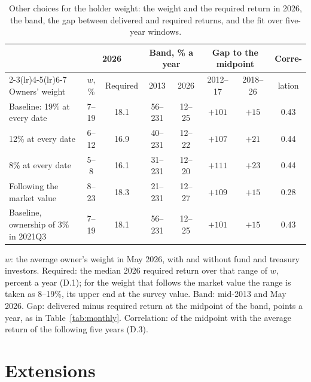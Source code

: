 \documentclass[11pt]{article}
\begin{document}
\begin{table}[ht]\centering\small
\caption{Other choices for the holder weight: the weight and the required return in 2026, the band, the gap between delivered and required returns, and the fit over five-year windows.}
\label{tab:paths}
\setlength{\tabcolsep}{4.5pt}
\begin{tabular}{lccccccc}
\toprule
 & \multicolumn{2}{c}{2026} & \multicolumn{2}{c}{Band, \% a year} & \multicolumn{2}{c}{Gap to the midpoint} & Corre- \\
\cmidrule(lr){2-3}\cmidrule(lr){4-5}\cmidrule(lr){6-7}
Owners' weight & $w$, \% & Required & 2013 & 2026 & 2012--17 & 2018--26 & lation \\
\midrule
Baseline: 19\% at every date & 7--19 & 18.1 & 56--231 & 12--25 & $+101$ & $+15$ & 0.43 \\
12\% at every date & 6--12 & 16.9 & 40--231 & 12--22 & $+107$ & $+21$ & 0.44 \\
8\% at every date & 5--8 & 16.1 & 31--231 & 12--20 & $+111$ & $+23$ & 0.44 \\
Following the market value & 8--23 & 18.3 & 21--231 & 12--27 & $+109$ & $+15$ & 0.28 \\
Baseline, ownership of 3\% in 2021Q3 & 7--19 & 18.1 & 56--231 & 12--25 & $+101$ & $+15$ & 0.43 \\
\bottomrule
\end{tabular}
\par\smallskip\parbox{0.92\textwidth}{\footnotesize $w$: the average owner's weight in May 2026, with and without fund and treasury investors. Required: the median 2026 required return over that range of $w$, percent a year (D.1); for the weight that follows the market value the range is taken as 8--19\%, its upper end at the survey value. Band: mid-2013 and May 2026. Gap: delivered minus required return at the midpoint of the band, points a year, as in Table~\ref{tab:monthly}. Correlation: of the midpoint with the average return of the following five years (D.3).}
\end{table}

\section{Extensions}
\end{document}
